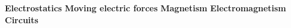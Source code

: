 \documentclass[8pt]{article}
\begin{document}
\textbf{Electrostatics}
\textbf{Moving electric forces}
\textbf{Magnetism}
\textbf{Electromagnetism}
\textbf{Circuits}
\end{document}
